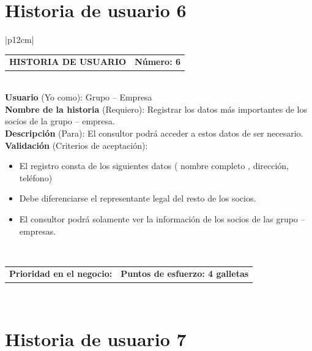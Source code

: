 \documentclass[11pt,letterpaper]{report}
\begin{document}
	\section{Historia de usuario 6}
	\begin{center}	
		\begin{tabular}{|p{12cm}|}
			\hline
			\begin{tabular}{c|c}
				\textbf{HISTORIA DE USUARIO} & \textbf{Número: 6} \\
			\end{tabular} \\ \hline
			\textbf{Usuario} (Yo como): Grupo – Empresa \\ \hline
			\textbf{Nombre de la historia} (Requiero): Registrar los datos más importantes de los socios de la grupo – empresa. \\ \hline
			\textbf{Descripción} (Para): El consultor podrá acceder a estos datos de ser necesario. \\ \hline
			\textbf{Validación} (Criterios de aceptación): \\
			\begin{minipage}{12cm}
				\begin{itemize}
					\item El registro consta de los siguientes datos ( nombre completo , dirección, teléfono)
					\item Debe diferenciarse el representante legal del resto de los socios.
					\item El consultor podrá solamente ver la información de los socios de las grupo – empresas.
				\end{itemize}
			\end{minipage} \\ \hline
			\begin{tabular}{p{6cm}|c}
				\textbf{Prioridad en el negocio: } & \textbf{Puntos de esfuerzo: 4 galletas} \\
			\end{tabular} \\ \hline
		\end{tabular}
	\end{center}
	
	\section{Historia de usuario 7}
	
\end{document}
